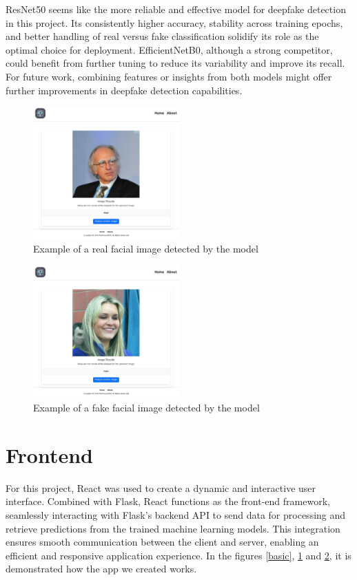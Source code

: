 \documentclass[conference]{IEEEtran}
\begin{document}
ResNet50 seems like the more reliable and effective model for deepfake detection in this project. Its consistently higher accuracy, stability across training epochs, and better handling of real versus fake classification solidify its role as the optimal choice for deployment. EfficientNetB0, although a strong competitor, could benefit from further tuning to reduce its variability and improve its recall. For future work, combining features or insights from both models might offer further improvements in deepfake detection capabilities.
\begin{figure}[ht]
\centering
\includegraphics[width=0.5\textwidth]{real1.jpg}
\caption{Example of a real facial image detected by the model}
\label{real1}
\end{figure}
\begin{figure}[ht]
\centering
\includegraphics[width=0.5\textwidth]{fake1.jpg}
\caption{Example of a fake facial image detected by the model}
\label{fake1}
\end{figure}
\section*{Frontend}

For this project, React was used to create a dynamic and interactive user interface. Combined with Flask, React functions as the front-end framework, seamlessly interacting with Flask's backend API to send data for processing and retrieve predictions from the trained machine learning models. This integration ensures smooth communication between the client and server, enabling an efficient and responsive application experience. In the figures \ref{basic}, \ref{real1} and \ref{fake1}, it is demonstrated how the app we created works.
\\
\end{document}
